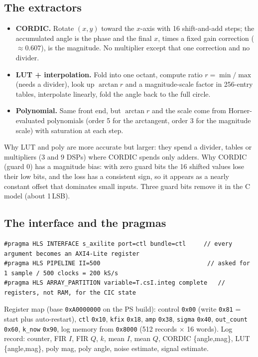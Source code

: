 \documentclass[10pt,a4paper]{article}
\renewcommand{\c}[1]{\texttt{#1}}
\begin{document}
\subsection{The extractors}
\begin{itemize}
\item \textbf{CORDIC.} Rotate $(x,y)$ toward the $x$-axis with 16 shift-and-add steps; the accumulated angle is the phase and the final $x$, times a fixed gain correction ($\approx0.607$), is the magnitude. No multiplier except that one correction and no divider.
\item \textbf{LUT + interpolation.} Fold into one octant, compute ratio $r=\min/\max$ (needs a divider), look up $\arctan r$ and a magnitude-scale factor in 256-entry tables, interpolate linearly, fold the angle back to the full circle.
\item \textbf{Polynomial.} Same front end, but $\arctan r$ and the scale come from Horner-evaluated polynomials (order 5 for the arctangent, order 3 for the magnitude scale) with saturation at each step.
\end{itemize}
Why LUT and poly are more accurate but larger: they spend a divider, tables or multipliers (3 and 9 DSPs) where CORDIC spends only adders. Why CORDIC (guard 0) has a magnitude bias: with zero guard bits the 16 shifted values lose their low bits, and the loss has a consistent sign, so it appears as a nearly constant offset that dominates small inputs. Three guard bits remove it in the C model (about 1\,LSB).

\subsection{The interface and the pragmas}
\begin{lstlisting}
#pragma HLS INTERFACE s_axilite port=ctl bundle=ctl     // every argument becomes an AXI4-Lite register
#pragma HLS PIPELINE II=500                              // asked for 1 sample / 500 clocks = 200 kS/s
#pragma HLS ARRAY_PARTITION variable=T.csI.integ complete   // registers, not RAM, for the CIC state
\end{lstlisting}
Register map (base \c{0xA0000000} on the PS build): control \c{0x00} (write \c{0x81} = start plus auto-restart), \c{ctl} \c{0x10}, \c{kfix} \c{0x18}, \c{amp} \c{0x38}, \c{sigma} \c{0x40}, \c{out\_count} \c{0x60}, \c{k\_now} \c{0x90}, log memory from \c{0x8000} (512 records $\times$ 16 words). Log record: counter, FIR $I$, FIR $Q$, $k$, mean $I$, mean $Q$, CORDIC \{angle,mag\}, LUT \{angle,mag\}, poly mag, poly angle, noise estimate, signal estimate.
\end{document}
